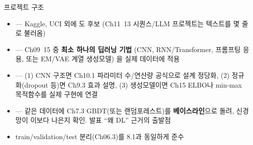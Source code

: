 \begin{frame}{프로젝트 구조}
  \begin{itemize}
    \item {} — Kaggle, UCI 외에 도 후보
      (Ch11~13 시퀀스/LLM 프로젝트는 텍스트를 몇 줄로 불러옴)
    \item {} — Ch09~15 중 \textbf{최소 하나의 딥러닝 기법}
      (CNN, RNN/Transformer, 프롬프팅 응용, 또는 EM/VAE 계열 생성모델)
     을 실제 데이터에 적용
    \item {} —
      (1) CNN 구조면 Ch10.1 파라미터 수/연산량 공식으로 설계 정당화,
      (2) 정규화(dropout 등)면 Ch9.3 효과 설명,
      (3) 생성모델이면 Ch15 ELBO나 min-max 목적함수를 실제 구현에 연결
    \item {} — 같은 데이터에 Ch7.3 GBDT(또는
      랜덤포레스트)를 \textbf{베이스라인}으로 돌려, 신경망이 이보다
      나은지 확인. 발표 ``왜 DL'' 근거의 출발점
    \item train/validation/test 분리(Ch06.3)를 8.1과 동일하게 준수
  \end{itemize}
\end{frame}
